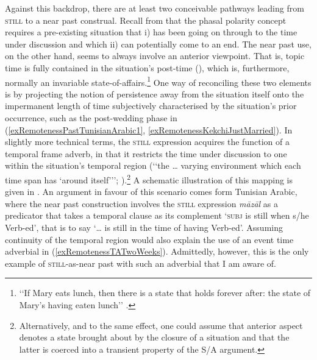 Against this backdrop, there are at least two conceivable pathways leading from \textsc{still} to a near past construal. Recall from  that the phasal polarity concept requires a pre-existing situation that i) has been going on through to the time under discussion and which ii) can potentially come to an end. The near past use, on the other hand, seems to always involve an anterior viewpoint. That is, topic time is fully contained in the situation's post-time (), which is, furthermore, normally an invariable state-of-affairs.\footnote{\lq\lq{}If Mary eats lunch, then there is a state that holds forever after: the state of Mary’s having eaten lunch\rq\rq{ } \parencite[234]{Parsons1990}.} One way of reconciling these two elements is by projecting the notion of persistence away from the situation itself onto the impermanent length of time subjectively characterised by the situation's prior occurrence, such as the post-wedding phase in (\ref{exRemotenessPastTunisianArabic1}, \ref{exRemotenessKekchiJustMarried}). In slightly more technical terms, the \textsc{still} expression acquires the function of a temporal frame adverb, in that it restricts the time under discussion to one within the situation's temporal region (\lq\lq{}the … varying environment which each time span has \lq{}around itself\rq {\rq\rq{}}; \cite[122]{Klein1994}).\footnote{Alternatively, and to the same effect, one could assume that anterior aspect denotes a state brought about by the closure of a situation and that the latter is coerced into a transient property of the S/A argument.}  A schematic illustration of this mapping is given in . An argument in favour of this scenario comes form Tunisian Arabic, where the near past construction involves the \textsc{still} expression \textit{māzāl} as a predicator that takes a temporal clause as its complement  \lq \textsc{subj} is still when s/he Verb-ed\rq{}, that is to say \lq{}… is still in the time of having Verb-ed'. Assuming continuity of the temporal region would also explain the use of an event time adverbial in (\ref{exRemotenessTATwoWeeks}). Admittedly, however, this is the only example of \textsc{still}-as-near past with such an adverbial that I am aware of.
 
